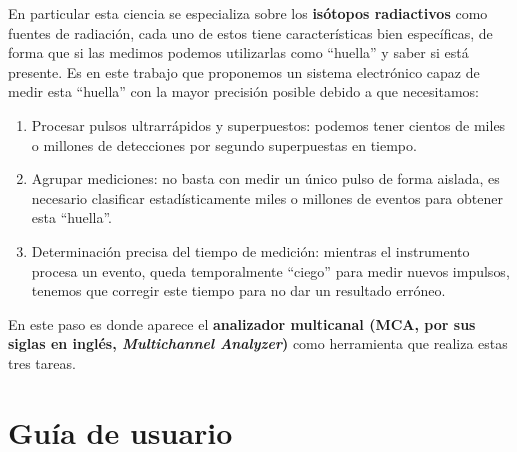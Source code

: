 En particular esta ciencia se especializa sobre los \textbf{isótopos
radiactivos} como fuentes de radiación, cada uno de estos tiene características
bien específicas, de forma que si las medimos podemos utilizarlas como
``huella'' y saber si está presente. Es en este trabajo que proponemos un
sistema electrónico capaz de medir esta ``huella'' con la mayor precisión
posible debido a que necesitamos:
\begin{enumerate}
  \item Procesar pulsos ultrarrápidos y superpuestos: podemos tener cientos de
    miles o millones de detecciones por segundo superpuestas en tiempo.
  \item Agrupar mediciones: no basta con medir un único pulso de forma aislada,
    es necesario clasificar estadísticamente miles o millones de eventos para
    obtener esta ``huella''.
  \item Determinación precisa del tiempo de medición: mientras el instrumento
    procesa un evento, queda temporalmente ``ciego'' para medir nuevos
    impulsos, tenemos que corregir este tiempo para no dar un resultado
    erróneo.
\end{enumerate}
En este paso es donde aparece el \textbf{analizador multicanal (MCA, por sus
siglas en inglés, \emph{Multichannel Analyzer})} como herramienta que realiza
estas tres tareas.

\section{Guía de usuario}
\label{S:usr-guia}

